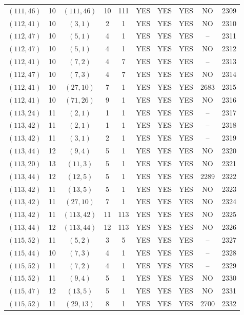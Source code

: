 \begin{longtable}{|c|c|c|c|c|c|c|c|c|c|}
$(111, 46)$ & 10 & $(111, 46)$ & 10 & 111 & YES & YES & YES & NO & 2309\\
$(112, 41)$ & 10 & $(3, 1)$ & 2 & 1 & YES & YES & YES & NO & 2310\\
$(112, 47)$ & 10 & $(5, 1)$ & 4 & 1 & YES & YES & YES & -- & 2311\\
$(112, 47)$ & 10 & $(5, 1)$ & 4 & 1 & YES & YES & YES & NO & 2312\\
$(112, 41)$ & 10 & $(7, 2)$ & 4 & 7 & YES & YES & YES & -- & 2313\\
$(112, 47)$ & 10 & $(7, 3)$ & 4 & 7 & YES & YES & YES & NO & 2314\\
$(112, 41)$ & 10 & $(27, 10)$ & 7 & 1 & YES & YES & YES & 2683 & 2315\\
$(112, 41)$ & 10 & $(71, 26)$ & 9 & 1 & YES & YES & YES & NO & 2316\\
$(113, 24)$ & 11 & $(2, 1)$ & 1 & 1 & YES & YES & YES & -- & 2317\\
$(113, 42)$ & 11 & $(2, 1)$ & 1 & 1 & YES & YES & YES & -- & 2318\\
$(113, 42)$ & 11 & $(3, 1)$ & 2 & 1 & YES & YES & YES & -- & 2319\\
$(113, 44)$ & 12 & $(9, 4)$ & 5 & 1 & YES & YES & YES & NO & 2320\\
$(113, 20)$ & 13 & $(11, 3)$ & 5 & 1 & YES & YES & YES & NO & 2321\\
$(113, 44)$ & 12 & $(12, 5)$ & 5 & 1 & YES & YES & YES & 2289 & 2322\\
$(113, 42)$ & 11 & $(13, 5)$ & 5 & 1 & YES & YES & YES & NO & 2323\\
$(113, 42)$ & 11 & $(27, 10)$ & 7 & 1 & YES & YES & YES & NO & 2324\\
$(113, 42)$ & 11 & $(113, 42)$ & 11 & 113 & YES & YES & YES & NO & 2325\\
$(113, 44)$ & 12 & $(113, 44)$ & 12 & 113 & YES & YES & YES & NO & 2326\\
$(115, 52)$ & 11 & $(5, 2)$ & 3 & 5 & YES & YES & YES & -- & 2327\\
$(115, 44)$ & 10 & $(7, 3)$ & 4 & 1 & YES & YES & YES & -- & 2328\\
$(115, 52)$ & 11 & $(7, 2)$ & 4 & 1 & YES & YES & YES & -- & 2329\\
$(115, 52)$ & 11 & $(9, 4)$ & 5 & 1 & YES & YES & YES & NO & 2330\\
$(115, 47)$ & 12 & $(13, 5)$ & 5 & 1 & YES & YES & YES & NO & 2331\\
$(115, 52)$ & 11 & $(29, 13)$ & 8 & 1 & YES & YES & YES & 2700 & 2332\\

\end{longtable}
